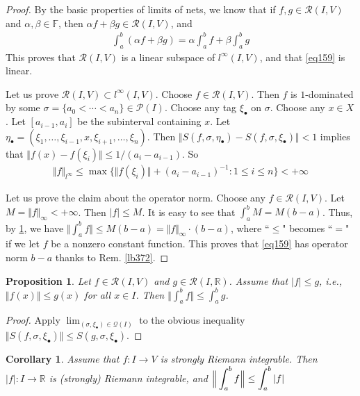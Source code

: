 \documentclass[12pt,b5paper,notitlepage]{article}
\theoremstyle{definition}
\theoremstyle{plain}
\newtheorem{pp}[df]{Proposition}
\newtheorem{co}[df]{Corollary}
\newcommand{\mc}{\mathcal}
\newcommand{\scr}{\mathscr}
\newcommand{\blt}{\bullet}
\newcommand{\Rbb}{\mathbb R}
\newcommand{\Fbb}{\mathbb F}
\newcommand{\dps}{\displaystyle}
\numberwithin{equation}{section}
\begin{document}
\begin{proof}
By the basic properties of limits of nets, we know that if $f,g\in\scr R(I,V)$ and $\alpha,\beta\in\Fbb$, then $\alpha f+\beta g\in\scr R(I,V)$, and
\begin{align}
\int_a^b (\alpha f+\beta g)=\alpha\int_a^b f+\beta\int_a^b g
\end{align}
This proves that $\scr R(I,V)$ is a linear subspace of $l^\infty(I,V)$, and that \eqref{eq159} is linear. 

Let us prove $\scr R(I,V)\subset l^\infty(I,V)$. Choose $f\in\scr R(I,V)$. Then $f$ is $1$-dominated by some $\sigma=\{a_0<\cdots<a_n\}\in\mc P(I)$. Choose any tag $\xi_\blt$ on $\sigma$. Choose any $x\in X$. Let $[a_{i-1},a_i]$ be the subinterval containing $x$. Let $\eta_\blt=(\xi_1,\dots,\xi_{i-1},x,\xi_{i+1},\dots,\xi_n)$. Then $\Vert S(f,\sigma,\eta_\blt)-S(f,\sigma,\xi_\blt)\Vert<1$ implies that $\Vert f(x)-f(\xi_i)\Vert\leq 1/(a_i-a_{i-1})$. So
\begin{align*}
\Vert f\Vert_{l^\infty}\leq \max\big\{\Vert f(\xi_i)\Vert+(a_i-a_{i-1})^{-1}:1\leq i\leq n  \big\}<+\infty
\end{align*}

Let us prove the claim about the operator norm. Choose any $f\in\scr R(I,V)$. Let $M=\Vert f\Vert_\infty<+\infty$. Then $|f|\leq M$. It is easy to see that $\int_a^b M=M(b-a)$. Thus, by \ref{lb379}, we have $\Vert\int_a^b f\Vert\leq M(b-a)=\Vert f\Vert_\infty\cdot(b-a)$, where ``$\leq$" becomes ``$=$" if we let $f$ be a nonzero constant function. This proves that \eqref{eq159} has operator norm $b-a$ thanks to Rem. \ref{lb372}.
\end{proof}



\begin{pp}\label{lb379}
Let $f\in\scr R(I,V)$ and $g\in\scr R(I,\Rbb)$. Assume that $|f|\leq g$, i.e., $\Vert f(x)\Vert\leq g(x)$ for all $x\in I$. Then $\dps \Big\Vert \int_a^b f \Big\Vert\leq\int_a^b g$.
\end{pp}


\begin{proof}
Apply $\lim_{(\sigma,\xi_\blt)\in\mc Q(I)}$ to the obvious inequality $\Vert S(f,\sigma,\xi_\blt) \Vert\leq S(g,\sigma,\xi_\blt)$.
\end{proof}


\begin{co}\label{lb417}
Assume that $f:I\rightarrow V$ is strongly Riemann integrable. Then $|f|:I\rightarrow\Rbb$ is (strongly) Riemann integrable, and $\dps\dps \Big\Vert \int_a^b f \Big\Vert\leq\int_a^b |f|$
\end{co}
\end{document}
